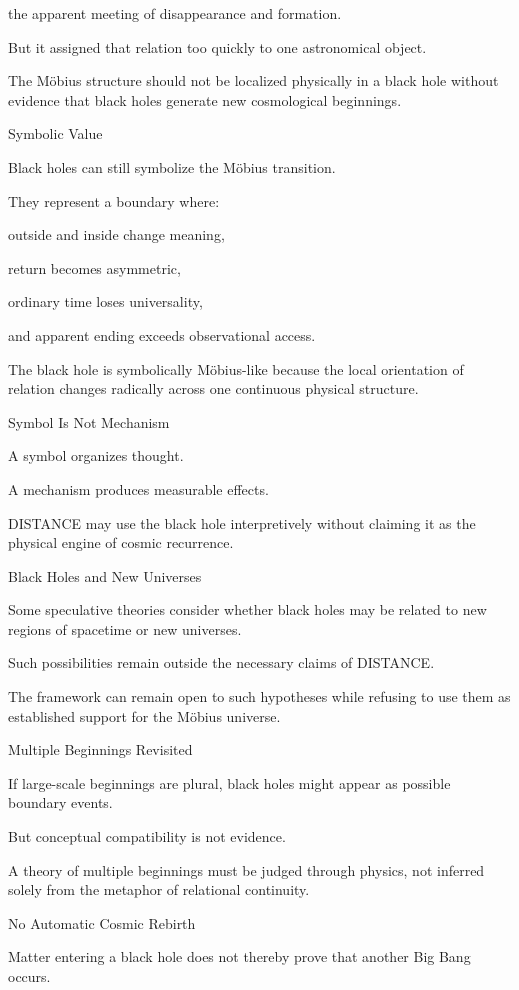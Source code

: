 the apparent meeting of disappearance and formation.

But it assigned that relation too quickly to one astronomical object.

The Möbius structure should not be localized physically in a black hole without evidence that black holes generate new cosmological beginnings.

Symbolic Value

Black holes can still symbolize the Möbius transition.

They represent a boundary where:

outside and inside change meaning,

return becomes asymmetric,

ordinary time loses universality,

and apparent ending exceeds observational access.

The black hole is symbolically Möbius-like because the local orientation of relation changes radically across one continuous physical structure.

Symbol Is Not Mechanism

A symbol organizes thought.

A mechanism produces measurable effects.

DISTANCE may use the black hole interpretively without claiming it as the physical engine of cosmic recurrence.

Black Holes and New Universes

Some speculative theories consider whether black holes may be related to new regions of spacetime or new universes.

Such possibilities remain outside the necessary claims of DISTANCE.

The framework can remain open to such hypotheses while refusing to use them as established support for the Möbius universe.

Multiple Beginnings Revisited

If large-scale beginnings are plural, black holes might appear as possible boundary events.

But conceptual compatibility is not evidence.

A theory of multiple beginnings must be judged through physics, not inferred solely from the metaphor of relational continuity.

No Automatic Cosmic Rebirth

Matter entering a black hole does not thereby prove that another Big Bang occurs.

